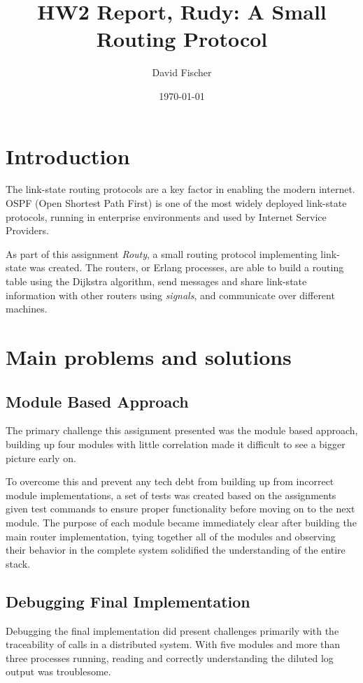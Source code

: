 \documentclass[a4paper, 11pt]{article}
\title{HW2 Report, Rudy: A Small Routing Protocol}
\author{David Fischer}
\date{\today{}}
\begin{document}
\maketitle

\section{Introduction}
The link-state routing protocols are a key factor in enabling the modern internet. OSPF (Open Shortest Path First) is one of the most widely deployed link-state protocols, running in enterprise environments and used by Internet Service Providers.

As part of this assignment \textit{Routy}, a small routing protocol implementing link-state was created. 
The routers, or Erlang processes, are able to build a routing table using the Dijkstra algorithm, send messages and share link-state information with other routers using \textit{signals}, and communicate over different machines.

\section{Main problems and solutions}

\subsection{Module Based Approach}

The primary challenge this assignment presented was the module based approach, building up four modules with little correlation made it difficult to see a bigger picture early on. 

To overcome this and prevent any tech debt from building up from incorrect module implementations, a set of tests was created based on the assignments given test commands to ensure proper functionality before moving on to the next module.
The purpose of each module became immediately clear after building the main router implementation, tying together all of the modules and observing their behavior in the complete system solidified the understanding of the entire stack. 

\subsection{Debugging Final Implementation}

Debugging the final implementation did present challenges primarily with the traceability of calls in a distributed system. With five modules and more than three processes running, reading and correctly understanding the diluted log output was troublesome.
\end{document}
